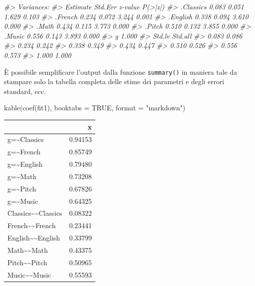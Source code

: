 \documentclass[
  11pt,
]{krantz}
\makeatletter
\newenvironment{Shaded}{\begin{snugshade}}{\end{snugshade}}
\newcommand{\AttributeTok}[1]{\textcolor[rgb]{0.61,0.61,0.61}{#1}}
\newcommand{\CommentTok}[1]{\textcolor[rgb]{0.37,0.37,0.37}{\textit{#1}}}
\newcommand{\ConstantTok}[1]{\textcolor[rgb]{0,0,0}{#1}}
\newcommand{\FunctionTok}[1]{\textcolor[rgb]{0,0,0}{#1}}
\newcommand{\NormalTok}[1]{#1}
\newcommand{\StringTok}[1]{\textcolor[rgb]{0.5,0.5,0.5}{#1}}
\newenvironment{kframe}{%
\medskip{}
\setlength{\fboxsep}{.8em}
 \def\at@end@of@kframe{}%
 \ifinner\ifhmode%
  \def\at@end@of@kframe{\end{minipage}}%
  \begin{minipage}{\columnwidth}%
 \fi\fi%
 \def\FrameCommand##1{\hskip\@totalleftmargin \hskip-\fboxsep
 \colorbox{shadecolor}{##1}\hskip-\fboxsep
     \hskip-\linewidth \hskip-\@totalleftmargin \hskip\columnwidth}%
 \MakeFramed {\advance\hsize-\width
   \@totalleftmargin\z@ \linewidth\hsize
   \@setminipage}}%
 {\par\unskip\endMakeFramed%
 \at@end@of@kframe}
\renewenvironment{Shaded}{\begin{kframe}}{\end{kframe}}
\theoremstyle{definition}
\theoremstyle{definition}
\theoremstyle{definition}
\theoremstyle{definition}
\theoremstyle{remark}
\makeatother
\begin{document}
\begin{Shaded}
\begin{Highlighting}[]
\CommentTok{\#\textgreater{} Variances:}
\CommentTok{\#\textgreater{}                    Estimate  Std.Err  z{-}value  P(\textgreater{}|z|)}
\CommentTok{\#\textgreater{}    .Classics          0.083    0.051    1.629    0.103}
\CommentTok{\#\textgreater{}    .French            0.234    0.072    3.244    0.001}
\CommentTok{\#\textgreater{}    .English           0.338    0.094    3.610    0.000}
\CommentTok{\#\textgreater{}    .Math              0.434    0.115    3.773    0.000}
\CommentTok{\#\textgreater{}    .Pitch             0.510    0.132    3.855    0.000}
\CommentTok{\#\textgreater{}    .Music             0.556    0.143    3.893    0.000}
\CommentTok{\#\textgreater{}     g                 1.000                           }
\CommentTok{\#\textgreater{}    Std.lv  Std.all}
\CommentTok{\#\textgreater{}     0.083    0.086}
\CommentTok{\#\textgreater{}     0.234    0.242}
\CommentTok{\#\textgreater{}     0.338    0.349}
\CommentTok{\#\textgreater{}     0.434    0.447}
\CommentTok{\#\textgreater{}     0.510    0.526}
\CommentTok{\#\textgreater{}     0.556    0.573}
\CommentTok{\#\textgreater{}     1.000    1.000}
\end{Highlighting}
\end{Shaded}

È possibile semplificare l'output dalla funzione \texttt{summary()} in maniera tale da stampare solo la tabella completa delle stime dei parametri e degli errori standard, ecc.

\begin{Shaded}
\begin{Highlighting}[]
\FunctionTok{kable}\NormalTok{(}\FunctionTok{coef}\NormalTok{(fit1), }\AttributeTok{booktabs =} \ConstantTok{TRUE}\NormalTok{, }\AttributeTok{format =} \StringTok{"markdown"}\NormalTok{)}
\end{Highlighting}
\end{Shaded}

\begin{longtable}[]{@{}lr@{}}
\toprule
& x \\
\midrule
\endhead
g=\textasciitilde Classics & 0.94153 \\
g=\textasciitilde French & 0.85749 \\
g=\textasciitilde English & 0.79480 \\
g=\textasciitilde Math & 0.73208 \\
g=\textasciitilde Pitch & 0.67826 \\
g=\textasciitilde Music & 0.64325 \\
Classics\textasciitilde\textasciitilde Classics & 0.08322 \\
French\textasciitilde\textasciitilde French & 0.23441 \\
English\textasciitilde\textasciitilde English & 0.33799 \\
Math\textasciitilde\textasciitilde Math & 0.43375 \\
Pitch\textasciitilde\textasciitilde Pitch & 0.50965 \\
Music\textasciitilde\textasciitilde Music & 0.55593 \\
\bottomrule
\end{longtable}
\end{document}
